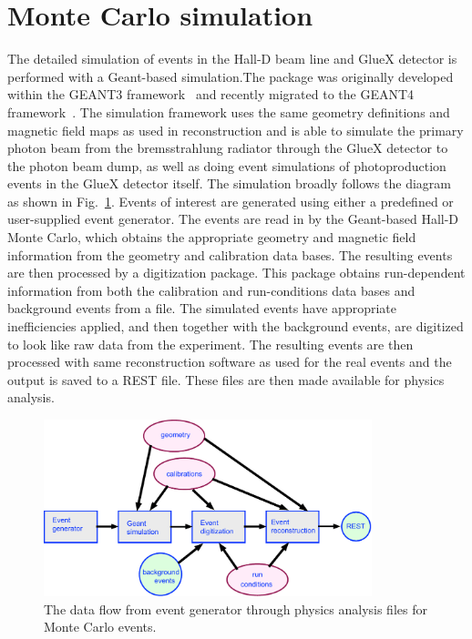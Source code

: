 \section[Monte Carlo]{Monte Carlo simulation \label{sec:simulation}}
The detailed simulation of events in the Hall-D beam line and GlueX detector is performed with a Geant-based simulation.The package was originally developed within the GEANT3 framework~\cite{Brun:1987ma} and recently migrated to the GEANT4 framework~\cite{Agostinelli:2002hh,Allison:2016lfl}. The simulation framework uses the same geometry definitions and magnetic field maps as used in reconstruction and is able to simulate the primary photon beam from the bremsstrahlung radiator through the GlueX detector to the photon beam dump, as well as doing event simulations of photoproduction events in the GlueX detector itself. The simulation broadly follows the diagram as shown in Fig.~\ref{fig:MC-data-flow}. Events of interest are generated using either a predefined or user-supplied event generator. The events are read in by the Geant-based Hall-D Monte Carlo, which obtains the appropriate geometry and magnetic field information from the geometry and calibration data bases. The resulting events are then processed by a digitization package. This package obtains run-dependent information from both the calibration and run-conditions data bases and background events from a file. The simulated events have appropriate inefficiencies applied, and then together with the background events, are digitized to look like raw data from the experiment. The resulting events are then processed with same reconstruction software as used for the real events and the output is saved to a REST file. These files are then made available for physics analysis.
\begin{figure}[h!]\centering
\includegraphics[width=0.85\textwidth]{figures/MC-data-flow.pdf}
\caption[]{\label{fig:MC-data-flow}The data flow from event generator through physics analysis files for Monte Carlo events.}
\end{figure}

